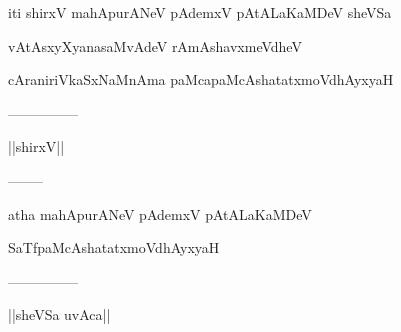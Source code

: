 \documentclass{article}
\begin{document}
\begin{center}
iti shirxV mahApurANeV pAdemxV pAtALaKaMDeV sheVSa
\end{center}

\begin{center}
vAtAsxyXyanasaMvAdeV rAmAshavxmeVdheV
\end{center}

\begin{center}
cAraniriVkaSxNaMnAma paMcapaMcAshatatxmoVdhAyxyaH
\end{center}

\begin{center}
---------------
\end{center}

\begin{center}
||shirxV||
\end{center}

\begin{center}
--------
\end{center}

\begin{center}
atha mahApurANeV pAdemxV pAtALaKaMDeV
\end{center}

\begin{center}
SaTfpaMcAshatatxmoVdhAyxyaH
\end{center}

\begin{center}
---------------
\end{center}

\begin{center}
||sheVSa uvAca||
\end{center}
\end{document}
